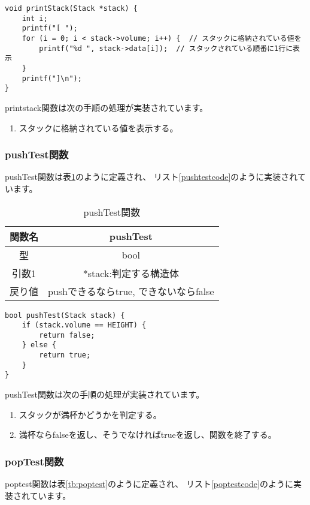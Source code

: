 \documentclass[a4j]{jarticle}
\begin{document}
\begin{lstlisting}[caption=printstack関数,label=printstackcode]
  void printStack(Stack *stack) {
    int i;
    printf("[ ");
    for (i = 0; i < stack->volume; i++) {  // スタックに格納されている値を
        printf("%d ", stack->data[i]);  // スタックされている順番に1行に表示
    }
    printf("]\n");
}
  \end{lstlisting}

printstack関数は次の手順の処理が実装されています。
\begin{enumerate}
  \item スタックに格納されている値を表示する。
\end{enumerate}

\subsubsection{pushTest関数}
\label{sec:pushTest}
pushTest関数は表\ref{tb:pushtest}のように定義され、
リスト\ref{pushtestcode}のように実装されています。

\begin{table}[h]
  \centering
  \caption{pushTest関数}
  \label{tb:pushtest}
  \begin{tabular}{|c|c|}
    \hline
    関数名 & pushTest                   \\
    \hline
    型   & bool                       \\
    \hline
    引数1 & *stack:判定する構造体             \\
    \hline
    戻り値 & pushできるならtrue, できないならfalse \\
    \hline
  \end{tabular}
\end{table}

\begin{lstlisting}[caption=pushTest関数,label=pushtestcode]
  bool pushTest(Stack stack) {
    if (stack.volume == HEIGHT) {
        return false;
    } else {
        return true;
    }
}
\end{lstlisting}

pushTest関数は次の手順の処理が実装されています。
\begin{enumerate}
  \item スタックが満杯かどうかを判定する。
  \item 満杯ならfalseを返し、そうでなければtrueを返し、関数を終了する。
\end{enumerate}

\subsubsection{popTest関数}
\label{sec:popTest}
poptest関数は表\ref{tb:poptest}のように定義され、
リスト\ref{poptestcode}のように実装されています。
\end{document}
